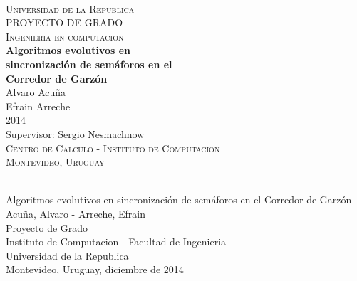 \begin{titlepage}
  \thispagestyle{empty}
  \begin{center}
    ~\\[2.2cm]



    \textsc{\Huge Universidad de la Republica } \\[2.5cm]
    \textsc{\Huge PROYECTO DE GRADO } \\[0.5cm]
    \textsc{\Huge Ingenieria en computacion } \\[2.5cm]    
    \textbf{\Huge Algoritmos evolutivos en } \\[0.2cm]
    \textbf{\Huge sincronización de semáforos en el } \\[0.3cm]
    \textbf{\Huge Corredor de Garzón } \\[1.5cm]    
    
    {\huge Alvaro Acuña} \\[0.2cm]
    {\huge Efrain Arreche} \\[0.2cm]
    {\Large 2014} \\[2.0cm]
    {\Large Supervisor: Sergio Nesmachnow} \\[1.0cm]

    \textsc{\large Centro de Calculo - Instituto de Computacion} \\[0.2cm]
    \textsc{\large Montevideo, Uruguay} \\[1.5cm]

  \end{center}
  \vfill
\end{titlepage}
{
  \thispagestyle{empty}
  ~\\[16cm]
  Algoritmos evolutivos en sincronización de semáforos en el Corredor de Garzón \\[0.05cm]
  Acuña, Alvaro - Arreche, Efrain \\[0.05cm]
  Proyecto de Grado \\[0.05cm]
  Instituto de Computacion - Facultad de Ingenieria \\[0.05cm]
  Universidad de la Republica \\[0.05cm]
  Montevideo, Uruguay, diciembre de 2014 \\[0.05cm]
  \vfill
  \cleardoublepage
}
\setcounter{page}{1}